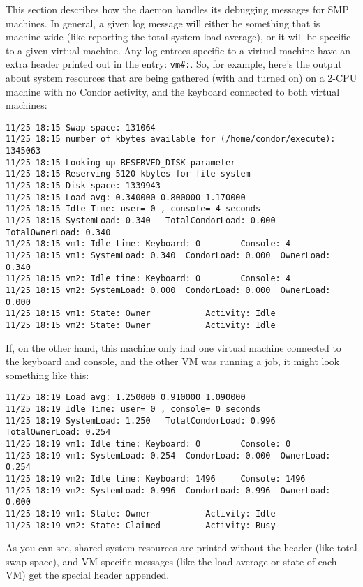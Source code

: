 This section describes how the  daemon
handles its debugging messages for SMP machines.
In general, a given log message will either be something that is
machine-wide (like reporting the total system load average), or it
will be specific to a given virtual machine.
Any log entrees specific to a virtual machine have an extra
header printed out in the entry: \texttt{vm\#:}.  
So, for example, here's the output about system resources that are
being gathered (with  and  turned on) on
a 2-CPU machine with no Condor activity, and the keyboard connected to
both virtual machines:
\begin{verbatim}
11/25 18:15 Swap space: 131064
11/25 18:15 number of kbytes available for (/home/condor/execute): 1345063
11/25 18:15 Looking up RESERVED_DISK parameter
11/25 18:15 Reserving 5120 kbytes for file system
11/25 18:15 Disk space: 1339943
11/25 18:15 Load avg: 0.340000 0.800000 1.170000
11/25 18:15 Idle Time: user= 0 , console= 4 seconds
11/25 18:15 SystemLoad: 0.340   TotalCondorLoad: 0.000  TotalOwnerLoad: 0.340
11/25 18:15 vm1: Idle time: Keyboard: 0        Console: 4
11/25 18:15 vm1: SystemLoad: 0.340  CondorLoad: 0.000  OwnerLoad: 0.340
11/25 18:15 vm2: Idle time: Keyboard: 0        Console: 4
11/25 18:15 vm2: SystemLoad: 0.000  CondorLoad: 0.000  OwnerLoad: 0.000
11/25 18:15 vm1: State: Owner           Activity: Idle
11/25 18:15 vm2: State: Owner           Activity: Idle
\end{verbatim}

If, on the other hand, this machine only had one virtual machine
connected to the keyboard and console, and the other VM was running a
job, it might look something like this:
\begin{verbatim}
11/25 18:19 Load avg: 1.250000 0.910000 1.090000
11/25 18:19 Idle Time: user= 0 , console= 0 seconds
11/25 18:19 SystemLoad: 1.250   TotalCondorLoad: 0.996  TotalOwnerLoad: 0.254
11/25 18:19 vm1: Idle time: Keyboard: 0        Console: 0
11/25 18:19 vm1: SystemLoad: 0.254  CondorLoad: 0.000  OwnerLoad: 0.254
11/25 18:19 vm2: Idle time: Keyboard: 1496     Console: 1496
11/25 18:19 vm2: SystemLoad: 0.996  CondorLoad: 0.996  OwnerLoad: 0.000
11/25 18:19 vm1: State: Owner           Activity: Idle
11/25 18:19 vm2: State: Claimed         Activity: Busy
\end{verbatim}

As you can see, shared system resources are printed without the header
(like total swap space), and VM-specific messages (like the load
average or state of each VM) get the special header appended.  

